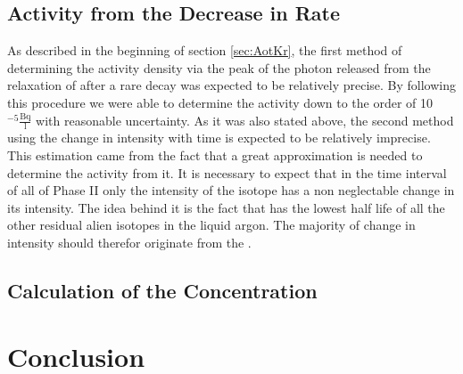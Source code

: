 \subsection{Activity from the Decrease in Rate}
\label{sec:SAfromDecrease}

As described in the beginning of section \ref{sec:AotKr}, the first method of determining the activity density via the peak of the photon released from the relaxation of   after a rare  decay was expected to be relatively precise.
By following this procedure we were able to determine the activity down to the order of 10$^{-5} \frac{\mathrm{Bq}}{\mathrm{l}}$ with reasonable uncertainty.
As it was also stated above, the second method using the change in intensity with time is expected to be relatively imprecise.
This estimation came from the fact that a great approximation is needed to determine the activity from it.
It is necessary to expect that in the time interval of all of Phase II only the intensity of the  isotope has a non neglectable change in its intensity.
The idea behind it is the fact that  has the lowest half life of all the other residual alien isotopes in the liquid argon.
The majority of change in intensity should therefor originate from the .
\\






\subsection{Calculation of the Concentration}
\label{sec:calcOfTheCon}


\section{Conclusion}


































